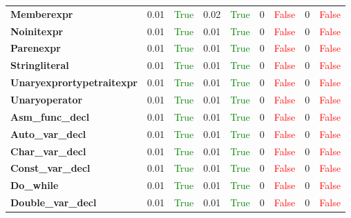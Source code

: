 \documentclass{article}
\begin{document}
\begin{xltabular}{\textwidth}{lcccccccc}
\textbf{{\fontsize{10}{12}\selectfont Memberexpr}}& 0.01&\textcolor{green}{True}& 0.02&\textcolor{green}{True}& 0&\textcolor{red}{False}& 0&\textcolor{red}{False} \\[0.5ex]
\textbf{{\fontsize{10}{12}\selectfont Noinitexpr}}& 0.01&\textcolor{green}{True}& 0.01&\textcolor{green}{True}& 0&\textcolor{red}{False}& 0&\textcolor{red}{False} \\[0.5ex]
\textbf{{\fontsize{10}{12}\selectfont Parenexpr}}& 0.01&\textcolor{green}{True}& 0.01&\textcolor{green}{True}& 0&\textcolor{red}{False}& 0&\textcolor{red}{False} \\[0.5ex]
\textbf{{\fontsize{10}{12}\selectfont Stringliteral}}& 0.01&\textcolor{green}{True}& 0.01&\textcolor{green}{True}& 0&\textcolor{red}{False}& 0&\textcolor{red}{False} \\[0.5ex]
\textbf{{\fontsize{10}{12}\selectfont Unaryexprortypetraitexpr}}& 0.01&\textcolor{green}{True}& 0.01&\textcolor{green}{True}& 0&\textcolor{red}{False}& 0&\textcolor{red}{False} \\[0.5ex]
\textbf{{\fontsize{10}{12}\selectfont Unaryoperator}}& 0.01&\textcolor{green}{True}& 0.01&\textcolor{green}{True}& 0&\textcolor{red}{False}& 0&\textcolor{red}{False} \\[0.5ex]
\textbf{{\fontsize{10}{12}\selectfont Asm\_func\_decl}}& 0.01&\textcolor{green}{True}& 0.01&\textcolor{green}{True}& 0&\textcolor{red}{False}& 0&\textcolor{red}{False} \\[0.5ex]
\textbf{{\fontsize{10}{12}\selectfont Auto\_var\_decl}}& 0.01&\textcolor{green}{True}& 0.01&\textcolor{green}{True}& 0&\textcolor{red}{False}& 0&\textcolor{red}{False} \\[0.5ex]
\textbf{{\fontsize{10}{12}\selectfont Char\_var\_decl}}& 0.01&\textcolor{green}{True}& 0.01&\textcolor{green}{True}& 0&\textcolor{red}{False}& 0&\textcolor{red}{False} \\[0.5ex]
\textbf{{\fontsize{10}{12}\selectfont Const\_var\_decl}}& 0.01&\textcolor{green}{True}& 0.01&\textcolor{green}{True}& 0&\textcolor{red}{False}& 0&\textcolor{red}{False} \\[0.5ex]
\textbf{{\fontsize{10}{12}\selectfont Do\_while}}& 0.01&\textcolor{green}{True}& 0.01&\textcolor{green}{True}& 0&\textcolor{red}{False}& 0&\textcolor{red}{False} \\[0.5ex]
\textbf{{\fontsize{10}{12}\selectfont Double\_var\_decl}}& 0.01&\textcolor{green}{True}& 0.01&\textcolor{green}{True}& 0&\textcolor{red}{False}& 0&\textcolor{red}{False} \\[0.5ex]

\end{xltabular}
\end{document}
